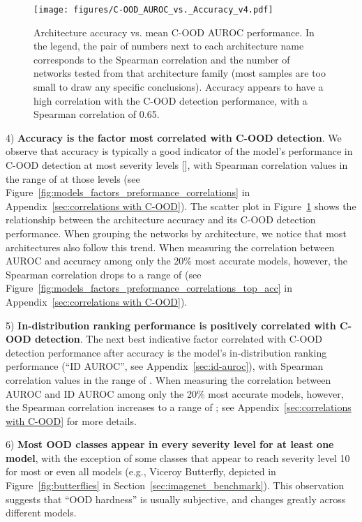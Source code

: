 \documentclass[table]{article} \usepackage{PRIMEarxiv}
\begin{document}
\begin{figure}[h]
    \centering
\texttt{[image: figures/C-OOD\_AUROC\_vs.\_Accuracy\_v4.pdf]}
    \caption{Architecture accuracy vs. mean C-OOD AUROC performance. 
    In the legend, the pair of numbers next to each architecture name corresponds to the Spearman correlation 
    and the number of networks tested from that architecture family (most samples are too small to draw any specific conclusions). 
    Accuracy appears to have a high correlation with the C-OOD detection performance, with a Spearman correlation of 0.65.
    }
    \label{fig:corr_Acc vs C-OOD AUROC}
\end{figure}
4) \textbf{Accuracy is the factor most correlated with C-OOD detection}.
We observe that accuracy is typically a good indicator of the model's performance in C-OOD detection at most severity levels [], with Spearman correlation values in the range of  at those levels (see Figure~\ref{fig:models_factors_preformance_correlations} in Appendix~\ref{sec:correlations with C-OOD}).
The scatter plot in Figure~\ref{fig:corr_Acc vs C-OOD AUROC} shows the relationship between
the architecture accuracy and its C-OOD detection performance.
When grouping the networks by architecture, we notice that most architectures also follow this trend.
When measuring the correlation between AUROC and accuracy among only the 20\% most accurate models, however, the Spearman correlation drops to a range of  (see Figure~\ref{fig:models_factors_preformance_correlations_top_acc} in Appendix~\ref{sec:correlations with C-OOD}).

5) \textbf{In-distribution ranking performance is positively correlated with C-OOD detection}.
The next best indicative factor correlated with C-OOD detection performance after accuracy is the model's in-distribution ranking performance (``ID AUROC'', see Appendix~\ref{sec:id-auroc}), with Spearman correlation values in the range of . When measuring the correlation between AUROC and ID AUROC among only the 20\% most accurate models, however, the Spearman correlation increases to a range of ;
see Appendix~\ref{sec:correlations with C-OOD} for more details.

6) \textbf{Most OOD classes appear in every severity level  for at least one model}, with the exception of some classes that appear to reach severity level 10 for most or even all models (e.g., Viceroy Butterfly, depicted in Figure~\ref{fig:butterflies} in Section~\ref{sec:imagenet_benchmark}).
This observation suggests that ``OOD hardness'' is usually subjective, and changes greatly across different models.
\end{document}
